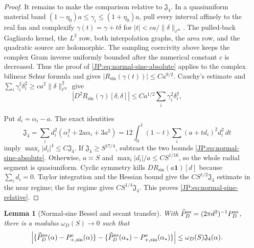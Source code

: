 \documentclass[11pt]{amsart}
\numberwithin{equation}{section}
\newtheorem{lemma}[theorem]{Lemma}
\theoremstyle{definition}
\theoremstyle{remark}
\newcommand{\Jfour}{\mathfrak J_4}
\begin{document}
\begin{proof}
It remains to make the comparison relative to $\Jfour$.  In a
quasiuniform material band
$(1-\eta_0)a\le\gamma_i\le(1+\eta_0)a$, pull every interval affinely to
the real fan and complexify
$\gamma(t)=\gamma+t\delta$ for
$|t|<ca/\|\delta\|_{\ell^\infty}$.  The pulled-back Gagliardo kernel, the
$L^2$ row, both interpolation graphs, the area row, and the quadratic
source are holomorphic.  The sampling coercivity above keeps the complex
Gram inverse uniformly bounded after the numerical constant $c$ is
decreased.  Thus the proof of \eqref{JP:eq:normal-sine-absolute} applies to
the complex bilinear Schur formula and gives
$|R_{\sin}(\gamma(t))|\le Ca^{9/2}$.  Cauchy's estimate and
$\sum_i\gamma_i^2\delta_i^2\ge ca^2
\|\delta\|_{\ell^\infty}^2$ give
\[
 |D^2R_{\sin}(\gamma)[\delta,\delta]|
 \le Ca^{1/2}\sum_i\gamma_i^2\delta_i^2,
\]

Put $d_i=\alpha_i-a$.  The exact identities
\[
 \Jfour=\sum_i d_i^2(\alpha_i^2+2a\alpha_i+3a^2)
 =12\int_0^1(1-t)\sum_i(a+td_i)^2d_i^2\,dt
\]
imply $\max_i|d_i|^4\le C\Jfour$.  If
$\Jfour\ge S^{17/4}$, subtract the two bounds
\eqref{JP:eq:normal-sine-absolute}.  Otherwise, $a\asymp S$ and
$\max_i|d_i|/a\le CS^{1/16}$, so the whole radial segment is
quasiuniform.  Cyclic symmetry kills
$DR_{\sin}(a\mathbf1)[d]$ because $\sum_i d_i=0$.  Taylor integration and
the Hessian bound give the $CS^{1/2}\Jfour$ estimate in the near regime;
the far regime gives $CS^{1/4}\Jfour$.  This proves
\eqref{JP:eq:normal-sine-relative}.
\end{proof}

\begin{lemma}[Normal-sine Bessel and secant transfer]
\label{JP:lem:normal-bessel-secant}
With $\widehat P_D^{\rm ns}=(2\pi d^2)^{-1}P_D^{\rm ns}$, there is a
modulus $\omega_D(S)\to0$ such that
\begin{equation}\label{JP:eq:normal-bessel-secant-relative}
 \left|\{\widehat P_D^{\rm ns}(\alpha)-P_{+,\sin}^{\rm e}(\alpha)\}
 -\{\widehat P_D^{\rm ns}(\alpha_*)-P_{+,\sin}^{\rm e}(\alpha_*)\}\right|
 \le\omega_D(S)\Jfour(\alpha).
\end{equation}
\end{lemma}
\end{document}

